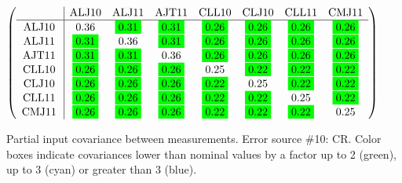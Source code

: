 \begin{table}[H]
\scriptsize
\begin{center}
\renewcommand{\arraystretch}{1.1}
\begin{math}\left(\begin{array}{c|ccccccc}
 & \mathrm{ALJ10} & 
\mathrm{ALJ11} & 
\mathrm{AJT11} & 
\mathrm{CLL10} & 
\mathrm{CLJ10} & 
\mathrm{CLL11} & 
\mathrm{CMJ11} \\
\hline
\mathrm{ALJ10} \hspace*{2pt} &       0.36 &  \colorbox{Green1}{$      0.31$} &  \colorbox{Green1}{$      0.31$} &  \colorbox{Green1}{$      0.26$} &  \colorbox{Green1}{$      0.26$} &  \colorbox{Green1}{$      0.26$} &  \colorbox{Green1}{$      0.26$} \\
\mathrm{ALJ11} \hspace*{2pt} &  \colorbox{Green1}{$      0.31$} &       0.36 &  \colorbox{Green1}{$      0.31$} &  \colorbox{Green1}{$      0.26$} &  \colorbox{Green1}{$      0.26$} &  \colorbox{Green1}{$      0.26$} &  \colorbox{Green1}{$      0.26$} \\
\mathrm{AJT11} \hspace*{2pt} &  \colorbox{Green1}{$      0.31$} &  \colorbox{Green1}{$      0.31$} &       0.36 &  \colorbox{Green1}{$      0.26$} &  \colorbox{Green1}{$      0.26$} &  \colorbox{Green1}{$      0.26$} &  \colorbox{Green1}{$      0.26$} \\
\mathrm{CLL10} \hspace*{2pt} &  \colorbox{Green1}{$      0.26$} &  \colorbox{Green1}{$      0.26$} &  \colorbox{Green1}{$      0.26$} &       0.25 &  \colorbox{Green1}{$      0.22$} &  \colorbox{Green1}{$      0.22$} &  \colorbox{Green1}{$      0.22$} \\
\mathrm{CLJ10} \hspace*{2pt} &  \colorbox{Green1}{$      0.26$} &  \colorbox{Green1}{$      0.26$} &  \colorbox{Green1}{$      0.26$} &  \colorbox{Green1}{$      0.22$} &       0.25 &  \colorbox{Green1}{$      0.22$} &  \colorbox{Green1}{$      0.22$} \\
\mathrm{CLL11} \hspace*{2pt} &  \colorbox{Green1}{$      0.26$} &  \colorbox{Green1}{$      0.26$} &  \colorbox{Green1}{$      0.26$} &  \colorbox{Green1}{$      0.22$} &  \colorbox{Green1}{$      0.22$} &       0.25 &  \colorbox{Green1}{$      0.22$} \\
\mathrm{CMJ11} \hspace*{2pt} &  \colorbox{Green1}{$      0.26$} &  \colorbox{Green1}{$      0.26$} &  \colorbox{Green1}{$      0.26$} &  \colorbox{Green1}{$      0.22$} &  \colorbox{Green1}{$      0.22$} &  \colorbox{Green1}{$      0.22$} &       0.25 \\
\end{array}\right)\end{math}
\caption{Partial input covariance between measurements. Error source \#10: CR. Color boxes indicate covariances lower than nominal values by a factor up to 2 (green), up to 3 (cyan) or greater than 3 (blue).}
\renewcommand{\arraystretch}{1}
\end{center}
\end{table}
